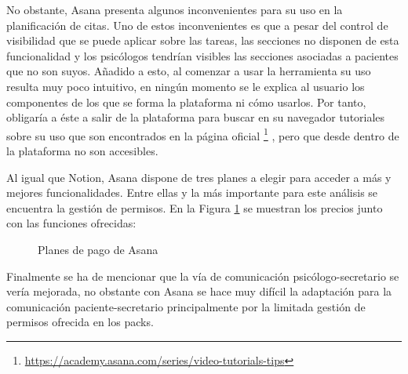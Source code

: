 No obstante, Asana presenta algunos inconvenientes para su uso en la planificación de citas. Uno de estos inconvenientes es que a pesar del control de visibilidad que se puede aplicar sobre las tareas, las secciones no disponen de esta funcionalidad y los psicólogos tendrían visibles las secciones asociadas a pacientes que no son suyos. Añadido a esto, al comenzar a usar la herramienta su uso resulta muy poco intuitivo, en ningún momento se le explica al usuario los componentes de los que se forma la plataforma ni cómo usarlos. Por tanto, obligaría a éste a salir de la plataforma para buscar en su navegador tutoriales sobre su uso que son encontrados en la página oficial \footnote{\url{https://academy.asana.com/series/video-tutorials-tips}} , pero que desde dentro de la plataforma no son accesibles. \bigskip

Al igual que Notion, Asana dispone de tres planes a elegir para acceder a más y mejores funcionalidades. Entre ellas y la más importante para este análisis se encuentra la gestión de permisos. En la Figura \ref{fig:asana-precios} se muestran los precios junto con las funciones ofrecidas:

\begin{figure}[H]
    \caption{Planes de pago de Asana}
    \label{fig:asana-precios}
\end{figure}

Finalmente se ha de mencionar que la vía de comunicación psicólogo-secretario se vería mejorada, no obstante con Asana se hace muy difícil la adaptación para la comunicación paciente-secretario principalmente por la limitada gestión de permisos ofrecida en los packs. \bigskip

